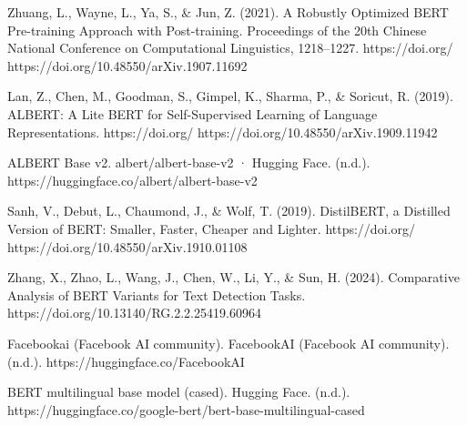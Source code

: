\documentclass[licencjacka,en]{pracamgr}
\begin{document}
\begin{thebibliography}{99}
Zhuang, L., Wayne, L., Ya, S., \& Jun, Z. (2021). A Robustly Optimized BERT Pre-training Approach with Post-training. Proceedings of the 20th Chinese National Conference on Computational Linguistics, 1218–1227. https://doi.org/ https://doi.org/10.48550/arXiv.1907.11692

Lan, Z., Chen, M., Goodman, S., Gimpel, K., Sharma, P., \& Soricut, R. (2019). ALBERT: A Lite BERT for Self-Supervised Learning of Language Representations. https://doi.org/ https://doi.org/10.48550/arXiv.1909.11942

ALBERT Base v2. albert/albert-base-v2 · Hugging Face. (n.d.). https://huggingface.co/albert/albert-base-v2

Sanh, V., Debut, L., Chaumond, J., \& Wolf, T. (2019). DistilBERT, a Distilled Version of BERT: Smaller, Faster, Cheaper and Lighter. https://doi.org/ https://doi.org/10.48550/arXiv.1910.01108

Zhang, X., Zhao, L., Wang, J., Chen, W., Li, Y., \& Sun, H. (2024). Comparative Analysis of BERT Variants for Text Detection Tasks. https://doi.org/10.13140/RG.2.2.25419.60964

Facebookai (Facebook AI community). FacebookAI (Facebook AI community). (n.d.). https://huggingface.co/FacebookAI

BERT multilingual base model (cased). Hugging Face. (n.d.). https://huggingface.co/google-bert/bert-base-multilingual-cased


\end{thebibliography}
\end{document}
